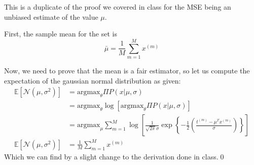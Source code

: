 This is a duplicate of the proof we covered in class for the MSE being an unbiased estimate of the value $\mu$.

First, the sample mean for the set is
\begin{equation*}
  \bar{\mu}=\frac{1}{M}\sum_{m=1}^{M}x^{(m)}
\end{equation*}

Now, we need to prove that the mean is a fair estimator, so let us compute the expectation of the gaussian normal distribution as given:
\begin{align*}
  \mathbb{E}[\mathcal{N}(\mu, \sigma^{2})] &= \text{argmax}_{\theta}\Pi P(x|\mu, \sigma)\\
                                           &= \text{argmax}_{\theta} \log\left[\text{argmax}_{\theta}\Pi P(x|\mu, \sigma)\right]\\
  &=\text{argmax}_{\mu}\sum^{M}_{m=1}\log\left[\frac{1}{\sqrt{2\pi}\sigma}\exp\left\{-\frac{1}{2}\left(\frac{t^{(m)}-\mu^{T}x^{(m)}}{\sigma}\right)\right\}\right]\\
  \mathbb{E}[\mathcal{N}(\mu, \sigma^{2})] &= \frac{1}{M}\sum^{M}_{m=1}x^{(m)}
\end{align*}
Which we can find by a slight change to the derivation done in class.\qed
